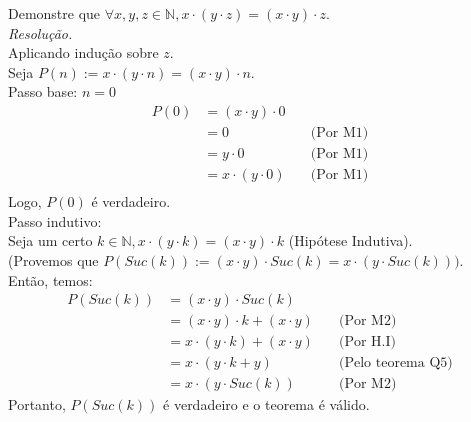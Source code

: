 Demonstre que $\forall x, y, z \in \mathbb{N}, x \cdot (y \cdot z) = (x \cdot y) \cdot z$. \\
\emph{Resolução.} \\
Aplicando indução sobre $z$. \\
Seja $P(n) := x \cdot (y \cdot n) = (x \cdot y) \cdot n$. \\
Passo base: $n = 0$
\begin{align*}
    P(0) & = (x \cdot y) \cdot 0                         \\
         & = 0                   & \quad \text{(Por M1)} \\
         & = y \cdot 0           & \quad \text{(Por M1)} \\
         & = x \cdot (y \cdot 0) & \quad \text{(Por M1)} \\
\end{align*}
Logo, $P(0)$ é verdadeiro. \\
Passo indutivo: \\
Seja um certo $k \in \mathbb{N}, x \cdot (y \cdot k) = (x \cdot y) \cdot k$ (Hipótese Indutiva). \\
(Provemos que $P(Suc(k)) := (x \cdot y) \cdot Suc(k) = x \cdot (y \cdot Suc(k)))$. \\
Então, temos:
\begin{align*}
    P(Suc(k)) & = (x \cdot y) \cdot Suc(k)                                           \\
              & =(x \cdot y) \cdot k + (x \cdot y)  & \quad \text{(Por M2)}          \\
              & = x \cdot (y \cdot k) + (x \cdot y) & \quad \text{(Por H.I)}         \\
              & = x \cdot (y \cdot k + y)           & \quad \text{(Pelo teorema Q5)} \\
              & = x \cdot (y \cdot Suc(k))          & \quad \text{(Por M2)}
\end{align*}
Portanto, $P(Suc(k))$ é verdadeiro e o teorema é válido.
